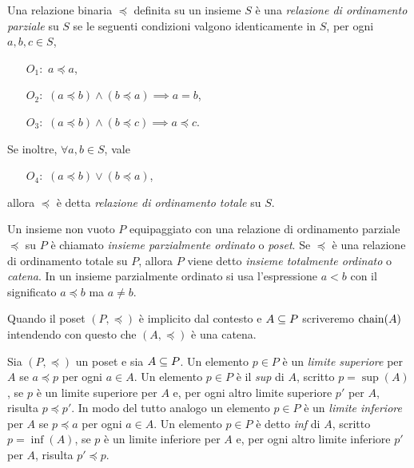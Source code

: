 \begin{definizione}  
Una relazione binaria $\preceq$ definita su un insieme
$S$ \`e una \emph{relazione di ordinamento parziale} su $S$
se le seguenti condizioni valgono identicamente in $S$,
per ogni $a, b, c \in S$,
\begin{itemize}
\item[$O_1:$] $a \preceq a$,
\item[$O_2:$] $(a \preceq b) \land (b \preceq a) \implies a = b$,
\item[$O_3:$] $(a \preceq b) \land (b \preceq c) \implies a \preceq c$.
\end{itemize}
Se inoltre, $\forall a, b \in S$, vale
\begin{itemize}
\item[$O_4:$] $(a \preceq b) \lor (b \preceq a)$,
\end{itemize}
allora $\preceq$ \`e detta \emph{relazione di ordinamento totale} su $S$.
\end{definizione}

\begin{definizione} 
Un insieme non vuoto $P$ equipaggiato con una relazione di ordinamento
parziale $\preceq$ su $P$ \`e chiamato
\emph{insieme parzialmente ordinato} o \emph{poset}.
Se $\preceq$ \`e una relazione di
ordinamento totale su $P$, allora $P$ viene detto
\emph{insieme totalmente ordinato} o \emph{catena}.
In un insieme parzialmente
ordinato si usa l'espressione $a<b$ con il significato $a\preceq b$ ma
$a \neq b$.
\end{definizione}

Quando il poset $(P, \preceq)$ \`e implicito dal contesto
e $A \subseteq P$ scriveremo $\mathop{\mathrm{chain}}\nolimits(A)$ intendendo con questo
che $(A, \preceq)$ \`e una catena.

\begin{definizione} 
Sia $(P, \preceq)$ un poset e sia $A \subseteq P$.
Un elemento $p \in P$ \`e un \emph{limite superiore} per $A$
se $a \preceq p$ per ogni $a\in A$.
Un elemento $p \in P$ \`e il \emph{sup} di $A$, scritto $p = \sup(A)$,
se $p$ \`e un limite superiore per $A$ e,
per ogni altro limite superiore $p'$ per $A$,
risulta $p \preceq p'$.
In modo del tutto analogo un elemento $p \in P$ \`e un \emph{limite inferiore}
per $A$ se $p \preceq a$ per ogni $a \in A$.
Un elemento $p \in P$ \`e detto \emph{inf} di $A$,
scritto $p = \inf(A)$, se $p$ \`e un limite inferiore per $A$ e,
per ogni altro limite inferiore $p'$ per $A$, risulta $p' \preceq p$.
\end{definizione}

